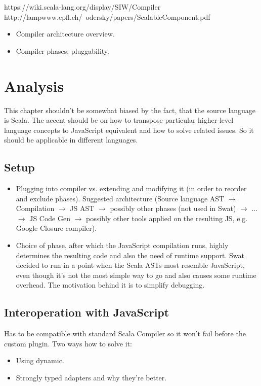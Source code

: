 \documentclass[12pt,a4paper]{report}
\begin{document}
https://wiki.scala-lang.org/display/SIW/Compiler
http://lampwww.epfl.ch/~odersky/papers/ScalableComponent.pdf

\begin{itemize}
\item Compiler architecture overview.
\item Compiler phases, pluggability.
\end{itemize}



\chapter{Analysis}

This chapter shouldn't be somewhat biased by the fact, that the source language is Scala. The accent should be on how to transpose particular higher-level language concepts to JavaScript equivalent and how to solve related issues. So it should be applicable in different languages.

\section{Setup}

\begin{itemize}
\item Plugging into compiler vs. extending and modifying it (in order to reorder and exclude phases). Suggested architecture (Source language AST $\rightarrow$ Compilation $\rightarrow$ JS AST $\rightarrow$ possibly other phases (not used in Swat) $\rightarrow$ ... $\rightarrow$ JS Code Gen $\rightarrow$ possibly other tools applied on the resulting JS, e.g. Google Closure compiler). 
\item Choice of phase, after which the JavaScript compilation runs, highly determines the resulting code and also the need of runtime support. Swat decided to run in a point when the Scala ASTs most resemble JavaScript, even though it's not the most simple way to go and also causes some runtime overhead. The motivation behind it is to simplify debugging.
\end{itemize}

\section{Interoperation with JavaScript}

Has to be compatible with standard Scala Compiler so it won't fail before the custom plugin. Two ways how to solve it: 
\begin{itemize}
\item Using dynamic.
\item Strongly typed adapters and why they're better.
\end{itemize}
\end{document}
